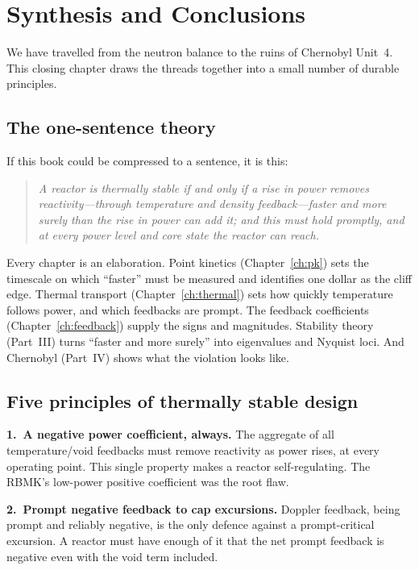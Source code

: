 \chapter{Synthesis and Conclusions}
\label{ch:synth}

We have travelled from the neutron balance to the ruins of Chernobyl Unit~4. This
closing chapter draws the threads together into a small number of durable
principles.

\section{The one-sentence theory}

If this book could be compressed to a sentence, it is this:
\begin{quote}
\emph{A reactor is thermally stable if and only if a rise in power removes
reactivity---through temperature and density feedback---faster and more surely than
the rise in power can add it; and this must hold promptly, and at every power
level and core state the reactor can reach.}
\end{quote}
Every chapter is an elaboration. Point kinetics
(Chapter~\ref{ch:pk}) sets the timescale on which ``faster'' must be measured and
identifies one dollar as the cliff edge. Thermal transport
(Chapter~\ref{ch:thermal}) sets how quickly temperature follows power, and which
feedbacks are prompt. The feedback coefficients (Chapter~\ref{ch:feedback}) supply
the signs and magnitudes. Stability theory (Part~III) turns ``faster and more
surely'' into eigenvalues and Nyquist loci. And Chernobyl (Part~IV) shows what the
violation looks like.

\section{Five principles of thermally stable design}

\textbf{1.\ A negative power coefficient, always.} The aggregate of all
temperature/void feedbacks must remove reactivity as power rises, at every
operating point. This single property makes a reactor self-regulating. The RBMK's
low-power positive coefficient was the root flaw.

\textbf{2.\ Prompt negative feedback to cap excursions.} Doppler feedback, being
prompt and reliably negative, is the only defence against a prompt-critical
excursion. A reactor must have enough of it that the net prompt feedback is
negative even with the void term included.

